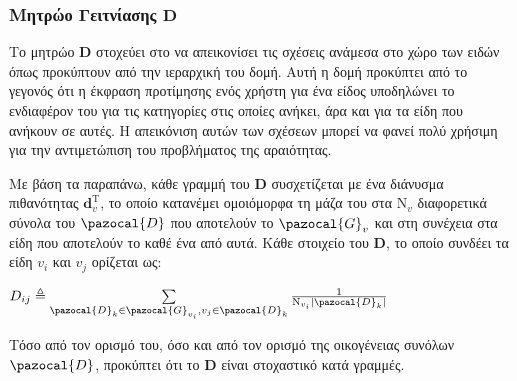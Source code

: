\subsubsection{Μητρώο Γειτνίασης $\mathbf{D}$}
Το μητρώο $\mathbf{D}$ στοχεύει στο να απεικονίσει τις σχέσεις ανάμεσα στο χώρο των ειδών όπως προκύπτουν από την ιεραρχική του δομή. Αυτή η δομή προκύπτει από το γεγονός ότι η έκφραση προτίμησης ενός χρήστη για ένα εί\-δος υποδηλώνει το ενδιαφέρον του για τις κατηγορίες στις οποίες ανήκει, άρα και για τα είδη που ανήκουν σε αυτές. Η απεικόνιση αυτών των σχέσεων μπορεί να φανεί πολύ χρήσιμη για την αντιμετώπιση του προβλήματος της αραιότητας. \par
Με βάση τα παραπάνω, κάθε γραμμή του $\mathbf{D}$ συσχετίζεται με ένα διάνυσμα πιθανότητας $\mathbf{d}_v^\text{T}$, το οποίο κατανέμει ομοιόμορφα τη μάζα του στα $\text{N}_v$ διαφορετικά σύνολα του $\pazocal{D}$ που αποτελούν το $\pazocal{G}_v$ και στη συνέχεια στα είδη που αποτελούν το καθέ ένα από αυτά. Κάθε στοιχείο του $\mathbf{D}$, το οποίο συνδέει τα είδη $v_i$ και $v_j$ ορίζεται ως:
\begin{center}
$D_{ij} \triangleq \sum\limits_{\pazocal{D}_k \in \pazocal{G}_{v_i}, v_j \in \pazocal{D}_k} \frac{1}{\text{N}_{v_i}|\pazocal{D}_k|}$
\end{center}
Τόσο από τον ορισμό του, όσο και από τον ορισμό της οικογένειας συνόλων $\pazocal{D}$, προκύπτει ότι το $\mathbf{D}$ είναι στοχαστικό κατά γραμμές. 
